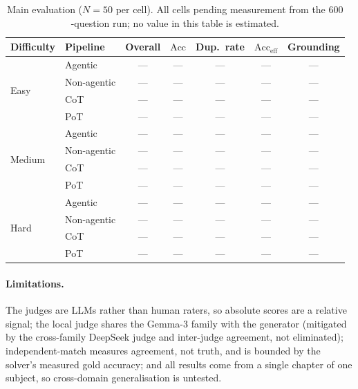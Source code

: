 \begin{table}[t]
\centering
\small
\begin{tabular}{llccccc}
\toprule
Difficulty & Pipeline & Overall & $\mathrm{Acc}$ & Dup.\ rate & $\mathrm{Acc}_{\mathrm{eff}}$ & Grounding \\
\midrule
\multirow{4}{*}{Easy}
 & Agentic     & --- & --- & --- & --- & --- \\
 & Non-agentic & --- & --- & --- & --- & --- \\
 & CoT         & --- & --- & --- & --- & --- \\
 & PoT         & --- & --- & --- & --- & --- \\
\midrule
\multirow{4}{*}{Medium}
 & Agentic     & --- & --- & --- & --- & --- \\
 & Non-agentic & --- & --- & --- & --- & --- \\
 & CoT         & --- & --- & --- & --- & --- \\
 & PoT         & --- & --- & --- & --- & --- \\
\midrule
\multirow{4}{*}{Hard}
 & Agentic     & --- & --- & --- & --- & --- \\
 & Non-agentic & --- & --- & --- & --- & --- \\
 & CoT         & --- & --- & --- & --- & --- \\
 & PoT         & --- & --- & --- & --- & --- \\
\bottomrule
\end{tabular}
\caption{Main evaluation ($N{=}50$ per cell). All cells pending measurement
from the $600$-question run; no value in this table is estimated.}
\label{tab:main}
\end{table}

\paragraph{Limitations.} The judges are LLMs rather than human raters, so
absolute scores are a relative signal; the local judge shares the Gemma-3
family with the generator (mitigated by the cross-family DeepSeek judge and
inter-judge agreement, not eliminated); independent-match measures agreement,
not truth, and is bounded by the solver's measured gold accuracy; and all
results come from a single chapter of one subject, so cross-domain
generalisation is untested.
